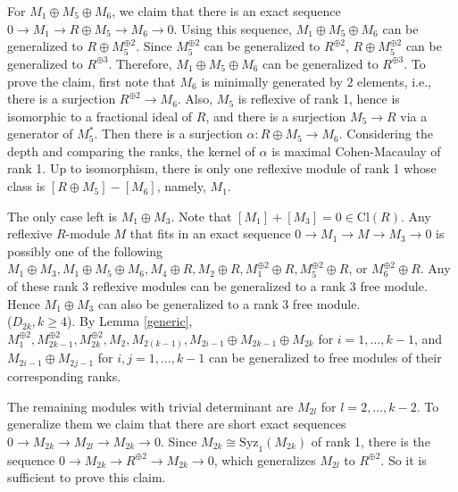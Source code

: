\documentclass{amsart}[12pt]
\theoremstyle{definition}
\theoremstyle{remark}
\numberwithin{equation}{section}
\begin{document}
For $M_1 \oplus M_5 \oplus M_6$, we claim that there is an exact sequence $0 \to M_1 \to R \oplus M_5 \to M_6 \to 0$. Using this sequence, $M_1 \oplus M_5 \oplus M_6$ can be generalized to $R \oplus M_5^{\oplus 2}$. Since $M_5^{\oplus 2}$ can be generalized to $R^{\oplus 2}$, $R \oplus M_5^{\oplus 2}$ can be generalized to $R^{\oplus 3}$. Therefore, $M_1 \oplus M_5 \oplus M_6$ can be generalized to $R^{\oplus 3}$. To prove the claim, first note that $M_6$ is minimally generated by $2$ elements, i.e., there is a surjection $R^{\oplus 2} \to M_6$. Also, $M_5$ is reflexive of rank 1, hence is isomorphic to a fractional ideal of $R$, and there is a surjection $M_5 \to R$ via a generator of $M_5^*$. Then there is a surjection $\alpha: R \oplus M_5 \to M_6$. Considering the depth and comparing the ranks, the kernel of $\alpha$ is maximal Cohen-Macaulay of rank 1. Up to isomorphism, there is only one reflexive module of rank 1 whose class is $[R \oplus M_5] - [M_6]$, namely, $M_1$. 

The only case left is $M_1 \oplus M_3$. Note that $[M_1] + [M_3] = 0 \in \mathrm{Cl}(R)$. Any reflexive $R$-module $M$ that fits in an exact sequence $0 \to M_1 \to M \to M_3 \to 0$ is possibly one of the following $M_1 \oplus M_3, M_1 \oplus M_5 \oplus M_6, M_4 \oplus R, M_2 \oplus R, M_1^{\oplus 2} \oplus R, M_5^{\oplus 2} \oplus R$, or $M_6^{\oplus 2} \oplus R$. Any of these rank 3 reflexive modules can be generalized to a rank 3 free module. Hence $M_1 \oplus M_3$ can also be generalized to a rank 3 free module. 
\\

($D_{2k}, k \geq 4$). By Lemma \ref{generic}, $M_1^{\oplus 2}, M_{2k - 1}^{\oplus 2}, M_{2k}^{\oplus 2}, M_{2}, M_{2(k - 1)}, M_{2i - 1} \oplus M_{2k - 1} \oplus M_{2k}$ for $i = 1, \dots, k - 1$, and $M_{2i - 1} \oplus M_{2j - 1}$ for $i, j = 1, \dots, k - 1$ can be generalized to free modules of their corresponding ranks. 

The remaining modules with trivial determinant are $M_{2l}$ for $l = 2, \dots, k - 2$. To generalize them we claim that there are short exact sequences $0 \to M_{2k} \to M_{2l} \to M_{2k} \to 0$. Since $M_{2k} \cong \mathrm{Syz}_1(M_{2k})$ of rank 1, there is the sequence $0 \to M_{2k} \to R^{\oplus 2} \to M_{2k} \to 0$, which generalizes $M_{2l}$ to $R^{\oplus 2}$. So it is sufficient to prove this claim. 
\end{document}
